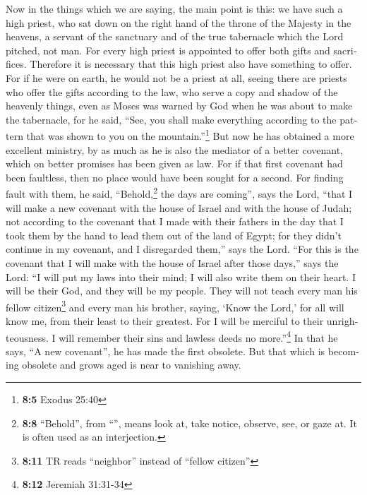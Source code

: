 \begin{paracol}{2}
\begin{otherlanguage}{english}
 Now in the things which we are saying, the main point is
this: we have such a high priest, who sat down on the right hand of the
throne of the Majesty in the heavens,  a servant of the
sanctuary and of the true tabernacle which the Lord pitched, not man.
 For every high priest is appointed to offer both gifts
and sacrifices. Therefore it is necessary that this high priest also
have something to offer.  For if he were on earth, he
would not be a priest at all, seeing there are priests who offer the
gifts according to the law,  who serve a copy and shadow
of the heavenly things, even as Moses was warned by God when he was
about to make the tabernacle, for he said, ``See, you shall make
everything according to the pattern that was shown to you on the
mountain.''\footnote{\textbf{8:5} Exodus 25:40}  But now
he has obtained a more excellent ministry, by as much as he is also the
mediator of a better covenant, which on better promises has been given
as law.  For if that first covenant had been faultless,
then no place would have been sought for a second.  For
finding fault with them, he said, ``Behold,\footnote{\textbf{8:8}
  ``Behold'', from ``'', means look at, take notice,
  observe, see, or gaze at. It is often used as an interjection.} the
days are coming'', says the Lord, ``that I will make a new covenant with
the house of Israel and with the house of Judah;  not
according to the covenant that I made with their fathers in the day that
I took them by the hand to lead them out of the land of Egypt; for they
didn't continue in my covenant, and I disregarded them,'' says the Lord.
 ``For this is the covenant that I will make with the
house of Israel after those days,'' says the Lord: ``I will put my laws
into their mind; I will also write them on their heart. I will be their
God, and they will be my people.  They will not teach
every man his fellow citizen\footnote{\textbf{8:11} TR reads
  ``neighbor'' instead of ``fellow citizen''} and every man his brother,
saying, `Know the Lord,' for all will know me, from their least to their
greatest.  For I will be merciful to their
unrighteousness. I will remember their sins and lawless deeds no
more.''\footnote{\textbf{8:12} Jeremiah 31:31-34}  In
that he says, ``A new covenant'', he has made the first obsolete. But
that which is becoming obsolete and grows aged is near to vanishing
away.


\end{otherlanguage}
\end{paracol}
